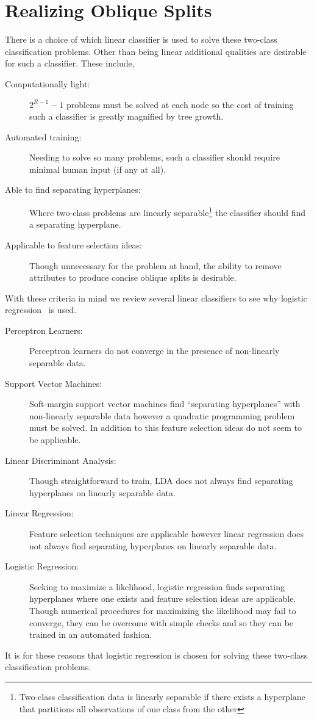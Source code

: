 \section{Realizing Oblique Splits}
\label{RealizingObliqueSplits}
There is a choice of which linear classifier is used to solve these two-class classification problems. Other than being linear additional qualities are desirable for such a classifier. These include,
\begin{description}
\item[Computationally light:] $2^{R-1}-1$ problems must be solved at each node so the cost of training such a classifier is greatly magnified by tree growth.
\item[Automated training:] Needing to solve so many problems, such a classifier should require minimal human input (if any at all). 
\item[Able to find separating hyperplanes:] Where two-class problems are linearly separable\footnote{Two-class classification data is linearly separable if there exists a hyperplane that partitions all observations of one class from the other} the classifier should find a separating hyperplane.
\item[Applicable to feature selection ideas:] Though unnecessary for the problem at hand, the ability to remove attributes to produce concise oblique splits is desirable.
\end{description}

With these criteria in mind we review several linear classifiers to see why logistic regression~\cite{cullagh-generalized} is used.

\begin{description}
\item[Perceptron Learners:] Perceptron learners do not converge in the presence of non-linearly separable data. %
\item[Support Vector Machines:] Soft-margin support vector machines find ``separating hyperplanes'' with non-linearly separable data however a quadratic programming problem must be solved. In addition to this feature selection ideas do not seem to be applicable.
\item[Linear Discriminant Analysis:] Though straightforward to train, LDA does not always find separating hyperplanes on linearly separable data. 
\item[Linear Regression:] Feature selection techniques are applicable however linear regression does not always find separating hyperplanes on linearly separable data. 
\item[Logistic Regression:] Seeking to maximize a likelihood, logistic regression finds separating hyperplanes where one exists and feature selection ideas are applicable. Though numerical procedures for maximizing the likelihood may fail to converge, they can be overcome with simple checks and so they can be trained in an automated fashion. 
\end{description}
It is for these reasons that logistic regression is chosen for solving these two-class classification problems.\\

